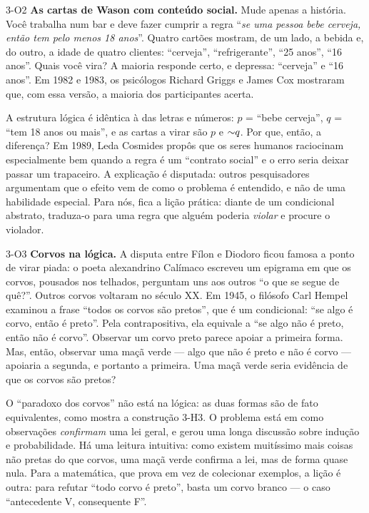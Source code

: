 \begin{obs}{3-O2}
\textbf{As cartas de Wason com conteúdo social.} Mude apenas a história. Você trabalha num bar e deve fazer cumprir a regra \enquote{\emph{se uma pessoa bebe cerveja, então tem pelo menos 18 anos}}. Quatro cartões mostram, de um lado, a bebida e, do outro, a idade de quatro clientes: \enquote{cerveja}, \enquote{refrigerante}, \enquote{25 anos}, \enquote{16 anos}. Quais você vira? A maioria responde certo, e depressa: \enquote{cerveja} e \enquote{16 anos}. Em 1982 e 1983, os psicólogos Richard Griggs e James Cox mostraram que, com essa versão, a maioria dos participantes acerta.

A estrutura lógica é idêntica à das letras e números: $p$ = \enquote{bebe cerveja}, $q$ = \enquote{tem 18 anos ou mais}, e as cartas a virar são $p$ e ${{\sim}}q$. Por que, então, a diferença? Em 1989, Leda Cosmides propôs que os seres humanos raciocinam especialmente bem quando a regra é um \enquote{contrato social} e o erro seria deixar passar um trapaceiro. A explicação é disputada: outros pesquisadores argumentam que o efeito vem de como o problema é entendido, e não de uma habilidade especial. Para nós, fica a lição prática: diante de um condicional abstrato, traduza-o para uma regra que alguém poderia \emph{violar} e procure o violador.
\end{obs}

\begin{obs}{3-O3}
\textbf{Corvos na lógica.} A disputa entre Fílon e Diodoro ficou famosa a ponto de virar piada: o poeta alexandrino Calímaco escreveu um epigrama em que os corvos, pousados nos telhados, perguntam uns aos outros \enquote{o que se segue de quê?}. Outros corvos voltaram no século XX. Em 1945, o filósofo Carl Hempel examinou a frase \enquote{todos os corvos são pretos}, que é um condicional: \enquote{se algo é corvo, então é preto}. Pela contrapositiva, ela equivale a \enquote{se algo não é preto, então não é corvo}. Observar um corvo preto parece apoiar a primeira forma. Mas, então, observar uma maçã verde — algo que não é preto e não é corvo — apoiaria a segunda, e portanto a primeira. Uma maçã verde seria evidência de que os corvos são pretos?

O \enquote{paradoxo dos corvos} não está na lógica: as duas formas são de fato equivalentes, como mostra a construção 3-H3. O problema está em como observações \emph{confirmam} uma lei geral, e gerou uma longa discussão sobre indução e probabilidade. Há uma leitura intuitiva: como existem muitíssimo mais coisas não pretas do que corvos, uma maçã verde confirma a lei, mas de forma quase nula. Para a matemática, que prova em vez de colecionar exemplos, a lição é outra: para refutar \enquote{todo corvo é preto}, basta um corvo branco — o caso \enquote{antecedente V, consequente F}.
\end{obs}

